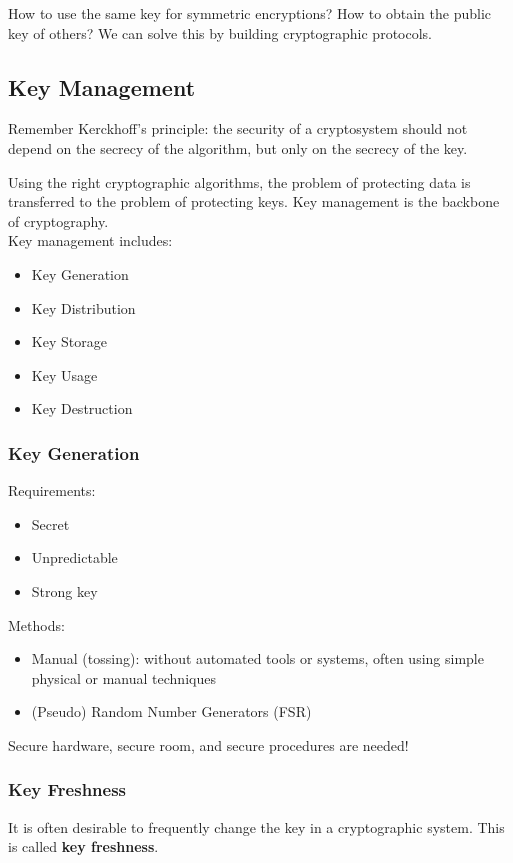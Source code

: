 How to use the same key for symmetric encryptions?
How to obtain the public key of others?
We can solve this by building cryptographic protocols.

\subsection{Key Management}
Remember Kerckhoff's principle: the security of a cryptosystem should not depend on the secrecy of the algorithm, but only on the secrecy of the key.

Using the right cryptographic algorithms, the problem of protecting
data is transferred to the problem of protecting keys.
Key management is the backbone of cryptography. \\

Key management includes:
\begin{itemize}
    \item Key Generation
    \item Key Distribution
    \item Key Storage
    \item Key Usage
    \item Key Destruction
\end{itemize}

\subsubsection{Key Generation}
Requirements:
\begin{itemize}
    \item Secret
    \item Unpredictable
    \item Strong key
\end{itemize}

Methods:
\begin{itemize}
    \item Manual (tossing):  without automated tools or systems, often using simple physical or manual techniques
    \item (Pseudo) Random Number Generators (FSR)
\end{itemize}

Secure hardware, secure room, and secure procedures are needed!

\subsubsection{Key Freshness}
It is often desirable to frequently change the key in a cryptographic
system. This is called \textbf{key freshness}.


